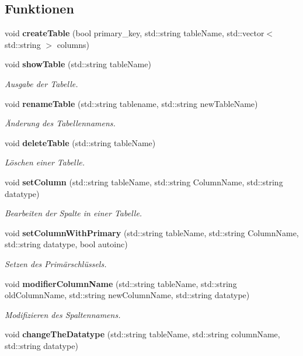 \subsection*{Funktionen}
\begin{DoxyCompactItemize}
\item 
void \textbf{ create\+Table} (bool primary\+\_\+key, std\+::string table\+Name, std\+::vector$<$ std\+::string $>$ columns)
\item 
void \textbf{ show\+Table} (std\+::string table\+Name)
\begin{DoxyCompactList}\small\item\em Ausgabe der Tabelle. \end{DoxyCompactList}\item 
void \textbf{ rename\+Table} (std\+::string tablename, std\+::string new\+Table\+Name)
\begin{DoxyCompactList}\small\item\em Änderung des Tabellennamens. \end{DoxyCompactList}\item 
void \textbf{ delete\+Table} (std\+::string table\+Name)
\begin{DoxyCompactList}\small\item\em Löschen einer Tabelle. \end{DoxyCompactList}\item 
void \textbf{ set\+Column} (std\+::string table\+Name, std\+::string Column\+Name, std\+::string datatype)
\begin{DoxyCompactList}\small\item\em Bearbeiten der Spalte in einer Tabelle. \end{DoxyCompactList}\item 
void \textbf{ set\+Column\+With\+Primary} (std\+::string table\+Name, std\+::string Column\+Name, std\+::string datatype, bool autoinc)
\begin{DoxyCompactList}\small\item\em Setzen des Primärschlüssels. \end{DoxyCompactList}\item 
void \textbf{ modifier\+Column\+Name} (std\+::string table\+Name, std\+::string old\+Column\+Name, std\+::string new\+Column\+Name, std\+::string datatype)
\begin{DoxyCompactList}\small\item\em Modifizieren des Spaltennamens. \end{DoxyCompactList}\item 
void \textbf{ change\+The\+Datatype} (std\+::string table\+Name, std\+::string column\+Name, std\+::string datatype)

\end{DoxyCompactItemize}
